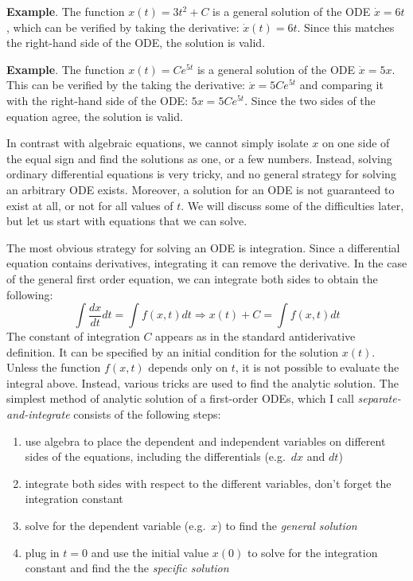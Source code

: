 \documentclass[
  letterpaper,
  DIV=11,
  numbers=noendperiod]{scrreprt}
\providecommand{\tightlist}{%
  \setlength{\itemsep}{0pt}\setlength{\parskip}{0pt}}\usepackage{longtable,booktabs,array}
\begin{document}
\textbf{Example}. The function \(x(t) = 3t^2 +C\) is a general solution
of the ODE \(\dot x = 6t\), which can be verified by taking the
derivative: \(\dot x (t) = 6t\). Since this matches the right-hand side
of the ODE, the solution is valid.

\textbf{Example}. The function \(x(t) = Ce^{5t}\) is a general solution
of the ODE \(\dot x = 5x\). This can be verified by the taking the
derivative: \(\dot x = 5C e^{5t}\) and comparing it with the right-hand
side of the ODE: \(5x = 5 Ce^{5t}\). Since the two sides of the equation
agree, the solution is valid.

In contrast with algebraic equations, we cannot simply isolate \(x\) on
one side of the equal sign and find the solutions as one, or a few
numbers. Instead, solving ordinary differential equations is very
tricky, and no general strategy for solving an arbitrary ODE exists.
Moreover, a solution for an ODE is not guaranteed to exist at all, or
not for all values of \(t\). We will discuss some of the difficulties
later, but let us start with equations that we can solve.

The most obvious strategy for solving an ODE is integration. Since a
differential equation contains derivatives, integrating it can remove
the derivative. In the case of the general first order equation, we can
integrate both sides to obtain the following:
\[ \int \frac{dx}{dt} dt = \int f(x,t) dt \Rightarrow x(t) + C = \int f(x,t) dt\]
The constant of integration \(C\) appears as in the standard
antiderivative definition. It can be specified by an initial condition
for the solution \(x(t)\). Unless the function \(f(x,t)\) depends only
on \(t\), it is not possible to evaluate the integral above. Instead,
various tricks are used to find the analytic solution. The simplest
method of analytic solution of a first-order ODEs, which I call
\emph{separate-and-integrate} consists of the following steps:

\begin{enumerate}
\def\labelenumi{\arabic{enumi}.}
\tightlist
\item
  use algebra to place the dependent and independent variables on
  different sides of the equations, including the differentials
  (e.g.~\(dx\) and \(dt\))
\item
  integrate both sides with respect to the different variables, don't
  forget the integration constant
\item
  solve for the dependent variable (e.g.~\(x\)) to find the
  \emph{general solution}
\item
  plug in \(t=0\) and use the initial value \(x(0)\) to solve for the
  integration constant and find the the \emph{specific solution}
\end{enumerate}
\end{document}
